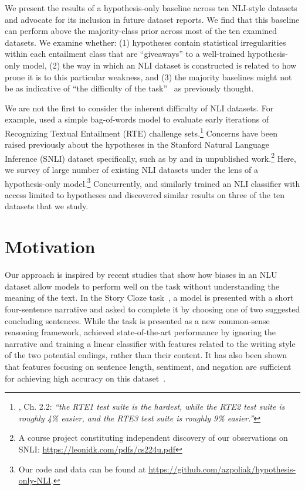 We present the results of a hypothesis-only baseline across ten NLI-style datasets and advocate for its inclusion in future dataset reports. We find that this baseline can perform above the majority-class prior across most of the ten examined datasets.  We examine whether: (1) hypotheses contain statistical irregularities within each entailment class that are ``giveaways'' to a well-trained hypothesis-only model, (2) the way in which an NLI dataset is constructed is related to how prone it is to this particular weakness, and (3) the majority baselines might not be as indicative of ``the difficulty of the task''~\cite{snli:emnlp2015} as previously thought.

We are not the first to consider the inherent difficulty of NLI datasets. For example, 
used a simple bag-of-words model to evaluate early iterations of Recognizing Textual Entailment (RTE) challenge sets.\footnote{, Ch. 2.2: \emph{``the RTE1 test suite is the hardest, while the RTE2 test suite is roughly 4\%
easier, and the RTE3 test suite is roughly 9\% easier.''}} Concerns have been raised previously about the hypotheses in the Stanford Natural Language Inference (SNLI) dataset specifically,  such as by 
and in unpublished work.\footnote{A course project constituting independent discovery of our observations on SNLI: \url{https://leonidk.com/pdfs/cs224u.pdf}}
Here, we survey of large number of existing NLI datasets under the lens of a hypothesis-only model.\footnote{
Our code and data can be found at
\url{https://github.com/azpoliak/hypothesis-only-NLI}.}
Concurrently,  and  similarly trained an NLI classifier with access limited to hypotheses and discovered similar results on three of the ten datasets that we study.

\section{Motivation}
Our approach is inspired by recent studies that show how biases in an NLU dataset allow models to perform well on the task without understanding the meaning of the text.  In the Story Cloze task~\cite{mostafazadeh-EtAl:2016:N16-1, mostafazadeh-EtAl:2017:LSDSem}, a model is presented with a short four-sentence narrative and asked to complete it by choosing one of two suggested concluding sentences.  While the task is presented as a new common-sense reasoning framework,  achieved state-of-the-art performance by ignoring the narrative and training a linear classifier with features related to the writing style of the two potential endings, rather than their content.  It has also been shown that features focusing on sentence length, sentiment, and negation are sufficient for achieving high accuracy on this dataset~\cite{schwartz2017effect,Cai2017PayAT,bugert2017lsdsem}.

